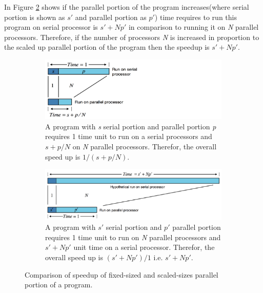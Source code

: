 In Figure \ref{fig:speedup_scaled} shows if the parallel portion of the program increases(where serial portion is shown as $ s' $ and parallel portion as $ p' $) time requires to run this program on serial processor is $ s' + Np'$ in comparison to running it on \textit{N} parallel processors. Therefore, if the number of processors \textit{N} is increased in proportion to the scaled up parallel portion of the program then the speedup is $ s' + Np'$.

\begin{figure}[!h]
	\begin{subfigure}[b]{\textwidth}
		\includegraphics[width= .9 \textwidth]{figs/speedup_fixed.png}
  		\caption{A program with \textit{s} serial portion and parallel portion \textit{p} requires 1 time unit to run on a serial processors and  $ s + p/N$ on \textit{N} parallel processors. Therefor, the overall speed up is $ 1/(s+p/N)$.}
  		\label{fig:speedup_fixed}
	\end{subfigure}
	\begin{subfigure}[b]{\textwidth}
		\includegraphics[width=\textwidth]{figs/speedup_scaled.png}
  		\caption{A program with $s'$ serial portion and $p'$ parallel portion requires 1 time unit to run on \textit{N} parallel processors and $ s' + Np'$ unit time on a serial processor. Therefor, the overall speed up is $ (s'+Np')/1$ i.e. $s'+Np'$.}
  		\label{fig:speedup_scaled}
	\end{subfigure}
	\caption{Comparison of speedup of fixed-sized and scaled-sizes parallel portion of a program.}
	\label{fig:speed_up_fixed_scaled}
\end{figure}

\citep{gustafson:88}

